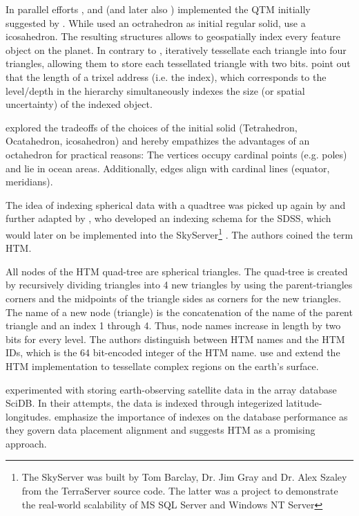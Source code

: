 \documentclass[letterpaper, parskip=half]{scrartcl}
\begin{document}
In parallel efforts \cite{Fekete1990, Fekete1990a}, and \cite{Goodchild1992} (and later also \cite{Lugo1995}) implemented the \gls{QTM} initially suggested by \cite{Dutton1984}. While \cite{Goodchild1992} used an octrahedron as initial regular solid, \cite{Fekete1990, Fekete1990a} use a icosahedron.
The resulting structures allows to geospatially index every feature object on the planet. 
In contrary to \cite{Dutton1984}, \cite{Fekete1990, Fekete1990a, Goodchild1992, Lugo1995} iteratively tessellate each triangle into four triangles, allowing them to store each tessellated triangle with two bits.
\cite{Goodchild1992} point out that the length of a trixel address (i.e. the index), which corresponds to the level/depth in the hierarchy simultaneously indexes the size (or spatial uncertainty) of the indexed object.

\cite{Dutton1996} explored the tradeoffs of the choices of the initial solid (Tetrahedron, Ocatahedron, icosahedron) and hereby empathizes the advantages of an octahedron for practical reasons: The vertices occupy cardinal points (e.g. poles) and lie in ocean areas. Additionally, edges align with cardinal lines (equator, meridians).

The idea of indexing spherical data with a quadtree was picked up again by \cite{Barret1995} and further adapted by \cite{Kunszt2000, Kunszt2001, Szalay2005}, who developed an indexing schema for the \gls{SDSS}, which would later on be implemented into the SkyServer\footnote{The SkyServer was built by Tom Barclay, Dr. Jim Gray and Dr. Alex Szaley from the TerraServer \citep{Barclay1998, Slutz1999} source code. The latter was a project to demonstrate the real-world scalability of MS SQL Server and Windows NT Server} \citep{Szalay2002, Thakar2003}.
The authors coined the term \gls{HTM}.

All nodes of the \gls{HTM} quad-tree are spherical triangles. The quad-tree is created by recursively dividing triangles into 4 new triangles by using the parent-triangles corners and the midpoints of the triangle sides as corners for the new triangles.
The name of a new node (triangle) is the concatenation of the name of the parent triangle and an index 1 through 4. Thus, node names increase in length by two bits for every level. The authors distinguish between \gls{HTM} names and the \gls{HTM} IDs, which is the 64 bit-encoded integer of the \gls{HTM} name. 
\cite{Kondor2014} use and extend the \gls{HTM} implementation to tessellate complex regions on the earth's surface.

\cite{Planthaber2012, Planthaber2012b, Krcal2015, Hausen2016, Doan2016} experimented with storing earth-observing satellite data in the array database SciDB. In their attempts, the data is indexed through integerized latitude-longitudes. \cite{Doan2016} emphasize the importance of indexes on the database performance as they govern data placement alignment and suggests \gls{HTM} as a promising approach.
\end{document}
